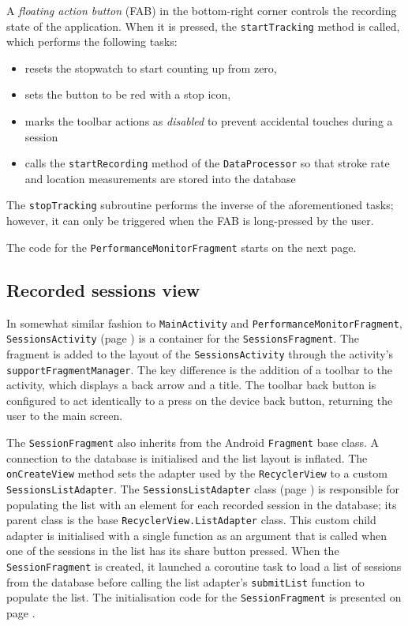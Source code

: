 \documentclass[11pt,twoside,a4paper]{report}
\begin{document}
A \textit{floating action button} (FAB) in the bottom-right corner controls the recording state of the application. When it is pressed, the \texttt{startTracking} method is called, which performs the following tasks:
\begin{itemize}
  \item resets the stopwatch to start counting up from zero,
  \item sets the button to be red with a stop icon,
  \item marks the toolbar actions as \textit{disabled} to prevent accidental touches during a session
  \item calls the \texttt{startRecording} method of the \texttt{DataProcessor} so that stroke rate and location measurements are stored into the database
\end{itemize}
The \texttt{stopTracking} subroutine performs the inverse of the aforementioned tasks; however, it can only be triggered when the FAB is long-pressed by the user.

The code for the \texttt{PerformanceMonitorFragment} starts on the next page.



\subsection{Recorded sessions view}

In somewhat similar fashion to \texttt{MainActivity} and \texttt{PerformanceMonitorFragment}, \texttt{SessionsActivity} (page \pageref{SessionsActivity}) is a container for the \texttt{SessionsFragment}. The fragment is added to the layout of the \texttt{SessionsActivity} through the activity's \texttt{supportFragmentManager}. The key difference is the addition of a toolbar to the activity, which displays a back arrow and a title. The toolbar back button is configured to act identically to a press on the device back button, returning the user to the main screen.

The \texttt{SessionFragment} also inherits from the Android \texttt{Fragment} base class. A connection to the database is initialised and the list layout is inflated. The \texttt{onCreateView} method sets the adapter used by the \texttt{RecyclerView} to a custom \texttt{SessionsListAdapter}. The \texttt{SessionsListAdapter} class (page \pageref{SessionsListAdapter}) is responsible for populating the list with an element for each recorded session in the database; its parent class is the base \texttt{RecyclerView.ListAdapter} class. This custom child adapter is initialised with a single function as an argument that is called when one of the sessions in the list has its share button pressed. When the \texttt{SessionFragment} is created, it launched a coroutine task to load a list of sessions from the database before calling the list adapter's \texttt{submitList} function to populate the list. The initialisation code for the \texttt{SessionFragment} is presented on page \pageref{SessionsFragment}.
\end{document}
